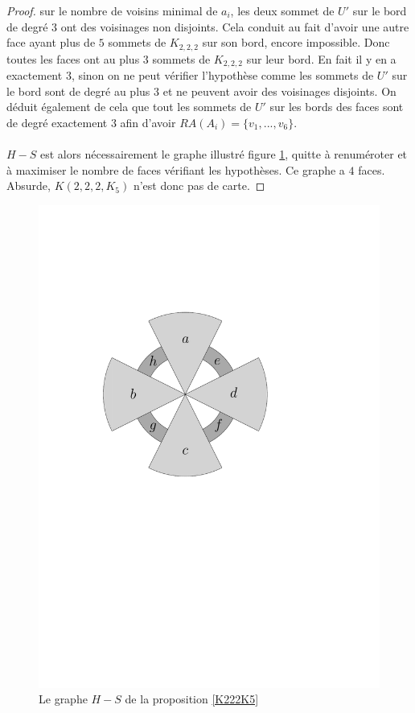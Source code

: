 \documentclass{scrartcl}
\begin{document}
\begin{flushleft}
\begin{proof}
    sur le nombre de voisins minimal de $a_i$, les deux sommet de $U'$ sur le bord de degré $3$ ont des voisinages non disjoints. Cela
    conduit au fait d'avoir une autre face ayant plus de $5$ sommets de $K_{2,2,2}$ sur son bord, encore impossible. Donc toutes les
    faces ont au plus $3$ sommets de $K_{2,2,2}$ sur leur bord. En fait il y en a exactement $3$, sinon on ne peut vérifier l'hypothèse comme
    les sommets de $U'$ sur le bord sont de degré au plus $3$ et ne peuvent avoir des voisinages disjoints. On déduit également de cela que tout les sommets
    de $U'$ sur les bords des faces sont de degré exactement $3$ afin d'avoir $RA(A_i) = \{v_1, ..., v_6\}$.
    \\~\\
    $H-S$ est alors nécessairement le graphe illustré figure \ref{temoinK222}, quitte à renuméroter et à maximiser le nombre de faces
    vérifiant les hypothèses.
    Ce graphe a $4$ faces. Absurde, $K(2,2,2,K_5)$ n'est donc pas de carte.
\end{proof}

\begin{figure}[h]
    \caption{Le graphe $H - S$ de la proposition \ref{K222K5}}\label{temoinK222}
    \begin{center}
        \includegraphics[page=\ipeFigtemoinK, scale = 0.5]{figs}
    \end{center}
\end{figure}


\end{flushleft}
\end{document}
